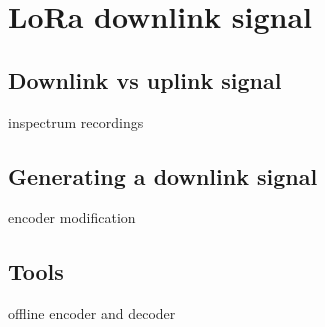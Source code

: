 \chapter{LoRa downlink signal}

\section{Downlink vs uplink signal}
inspectrum recordings

\section{Generating a downlink signal}
encoder modification


\section{Tools}
offline encoder and decoder